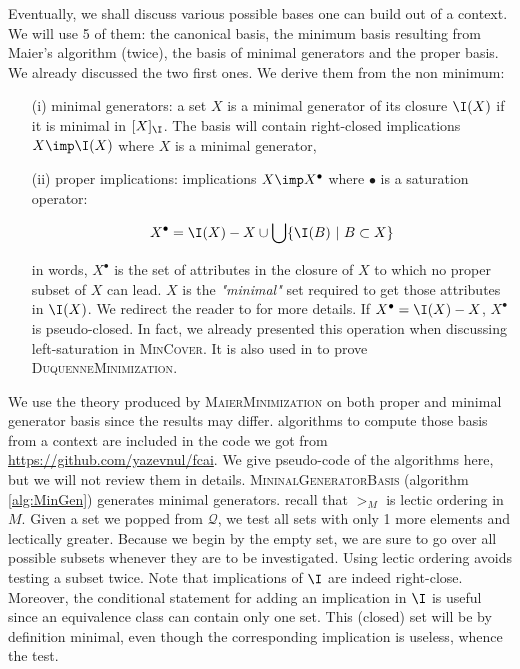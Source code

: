 \vspace{1.2em}

Eventually, we shall discuss various possible bases one can build out of a context. We will use 5 of them: the canonical basis, the minimum basis resulting from Maier's algorithm (twice), the basis of minimal generators and the proper basis. We already discussed the two first ones. We derive them from the non minimum:
\begin{itemize}
	\item[(i)] minimal generators: a set $X$ is a minimal generator of its closure $\I(X)$ if it is minimal in $[ X]_{\I}$. The basis will contain
	right-closed implications $X \imp \I(X)$ where $X$ is a minimal generator,
	\item[(ii)] proper implications: implications $X \imp X^{\bullet}$ where 
	$\bullet$ is a saturation operator:
	
		\[ X^{\bullet} = \I(X) - X \cup \bigcup \{ \I(B) \ | \ B \subset X \} \]
		
	in words, $X^{\bullet}$ is the set of attributes in the closure of $X$ to
	which no proper subset of $X$ can lead. $X$ is the \textit{"minimal"} set required to get those attributes in $\I(X)$. We redirect the reader to 
	\cite{ganter_conceptual_2016} for more details. If $X^{\bullet} = \I(X) - X$, $X^{\bullet}$ is pseudo-closed. In fact, we already presented this operation when discussing left-saturation in \textsc{MinCover}.	It is also used in \cite{duquenne_variations_2007} to prove \textsc{DuquenneMinimization}.
\end{itemize}
\noindent We use the theory produced by \textsc{MaierMinimization} on both proper and minimal generator basis since the results may differ. algorithms to compute those basis from a context are included in the code we got from \url{https://github.com/yazevnul/fcai}. We give pseudo-code of the algorithms here, but we will not review them in details. \textsc{MininalGeneratorBasis} (algorithm \ref{alg:MinGen}) generates minimal 
generators. recall that $>_{M}$ is lectic ordering in $M$. Given a set we popped
from $\mathcal{Q}$, we test all sets with only 1 more elements and lectically
greater. Because we begin by the empty set, we are sure to go over all possible
subsets whenever they are to be investigated. Using lectic ordering avoids testing a subset twice. Note that implications of $\I$ are indeed right-close.
Moreover, the conditional statement for adding an implication in $\I$ is useful
since an equivalence class can contain only one set. This (closed) set will
be by definition minimal, even though the corresponding implication is useless,
whence the test.

